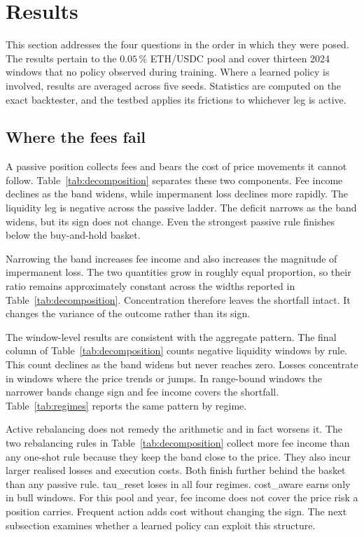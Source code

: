 \section{Results}
\label{sec:results}

This section addresses the four questions in the order in which they were
posed. The results pertain to the $0.05\,\%$ ETH/USDC pool and cover thirteen
2024 windows that no policy observed during training. Where a learned policy is
involved, results are averaged across five seeds. Statistics are computed on
the exact backtester, and the testbed applies its frictions to whichever leg is
active.

\subsection{Where the fees fail}

A passive position collects fees and bears the cost of price movements it
cannot follow. Table~\ref{tab:decomposition} separates these two components.
Fee income declines as the band widens, while impermanent loss declines more
rapidly. The liquidity leg is negative across the passive ladder. The deficit
narrows as the band widens, but its sign does not change. Even the strongest
passive rule finishes below the buy-and-hold basket.

Narrowing the band increases fee income and also increases the magnitude of
impermanent loss. The two quantities grow in roughly equal proportion, so their
ratio remains approximately constant across the widths reported in
Table~\ref{tab:decomposition}. Concentration therefore leaves the shortfall
intact. It changes the variance of the outcome rather than its sign.

The window-level results are consistent with the aggregate pattern. The final
column of Table~\ref{tab:decomposition} counts negative liquidity windows by
rule. This count declines as the band widens but never reaches zero. Losses concentrate in windows where the price
trends or jumps. In range-bound windows the narrower bands change sign and fee
income covers the shortfall. Table~\ref{tab:regimes} reports the same pattern
by regime.

Active rebalancing does not remedy the arithmetic and in fact worsens it. The
two rebalancing rules in Table~\ref{tab:decomposition} collect more fee income
than any one-shot rule because they keep the band close to the price. They also
incur larger realised losses and execution costs. Both finish further behind
the basket than any passive rule. \textsf{tau\_reset} loses in all four
regimes.
\textsf{cost\_aware} earns only in bull windows. For this pool and year, fee
income does not cover the price risk a position carries. Frequent action adds
cost without changing the sign. The next subsection examines whether a learned
policy can exploit this structure.

